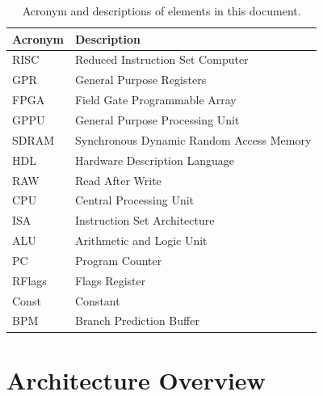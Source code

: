 \documentclass{article}
\begin{document}
  \FloatBarrier
  \begin{table}[H]
    \begin{center}
      \caption{Acronym and descriptions of elements in this document.}
      \label{tab:definitions}

      \begin{tabular}[pos]{|m{2cm} | m{9cm}|} 
	\hline %
	\cellcolor[gray]{0.9}\textbf{Acronym} & \cellcolor[gray]{0.9}\textbf{Description} \\ \hline
	RISC & Reduced Instruction Set Computer \\ \hline
	GPR & General Purpose Registers \\ \hline
	FPGA & Field Gate Programmable Array \\ \hline
	GPPU & General Purpose Processing Unit \\ \hline
	SDRAM & Synchronous Dynamic Random Access Memory\\ \hline
	HDL & Hardware Description Language \\ \hline
	RAW & Read After Write \\ \hline
	CPU & Central Processing Unit \\ \hline
	ISA & Instruction Set Architecture \\ \hline
	ALU & Arithmetic and Logic Unit \\ \hline
	PC  & Program Counter \\ \hline
	RFlags & Flags Register \\ \hline
	Const  & Constant \\ \hline
  BPM    & Branch Prediction Buffer \\ \hline
      \end{tabular}
    \end{center}
  \end{table}
  
  \newpage
  \section{Architecture Overview}
  \label{sec:architecture_overview}
  
\end{document}
